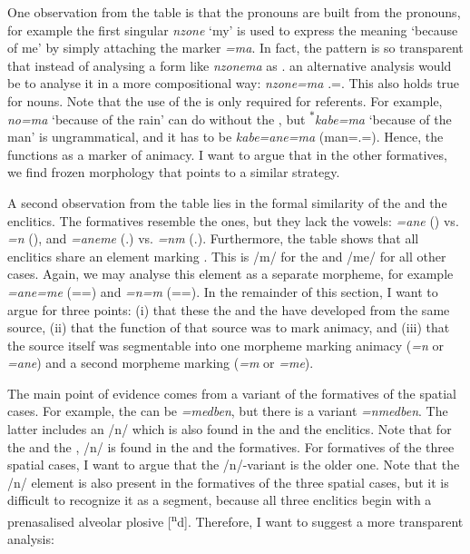 One observation from the table is that the  pronouns are built from the  pronouns, for example the first singular  \emph{nzone} `my' is used to express the meaning `because of me' by simply attaching the   marker \emph{=ma}. In fact, the pattern is so transparent that instead of analysing a form like \emph{nzonema} as \Fsg.\Char{} an alternative analysis would be to analyse it in a more compositional way: \emph{nzone=ma} \Fsg.\Poss=\Char{}. This also holds true for nouns. Note that the use of the  is only required for  referents. For example, \emph{no=ma} `because of the rain' can do without the , but \textsuperscript{$\ast$}\emph{kabe=ma} `because of the man' is ungrammatical, and it has to be \emph{kabe=ane=ma} (man=\Poss.\Sg=\Char). Hence, the  functions as a marker of animacy. I want to argue that in the other  formatives, we find frozen morphology that points to a similar strategy.%

A second observation from the table lies in the formal similarity of the  and the   enclitics. The  formatives resemble the  ones, but they lack the vowels: \emph{=ane} (\Poss) vs. \emph{=n} (\Dat), and \emph{=aneme} (\Poss.\Nsg) vs. \emph{=nm} (\Dat.\Nsg). Furthermore, the table shows that all  enclitics share an element marking  . This is /m/ for the  and /me/ for all other cases. Again, we may analyse this element as a separate morpheme, for example \emph{=ane=me} (=\Poss=\Nsg{}) and \emph{=n=m} (=\Dat=\Nsg{}). In the remainder of this section, I want to argue for three points: (i) that these the  and the  have developed from the same source, (ii) that the function of that source was to mark animacy, and (iii) that the source itself was segmentable into one morpheme marking animacy (\emph{=n} or \emph{=ane}) and a second morpheme marking   (\emph{=m} or \emph{=me}).%

The main point of evidence comes from a variant of the  formatives of the spatial cases. For example, the  can be \emph{=medben}, but there is a variant \emph{=nmedben}. The latter includes an /n/ which is also found in the  and the  enclitics. Note that for the  and the , /n/ is found in the  and the  formatives. For  formatives of the three spatial cases, I want to argue that the /n/-variant is the older one. Note that the /n/ element is also present in the  formatives of the three spatial cases, but it is difficult to recognize it as a segment, because all three  enclitics begin with a prenasalised alveolar plosive [\textsuperscript{n}d]. Therefore, I want to suggest a more transparent analysis:

